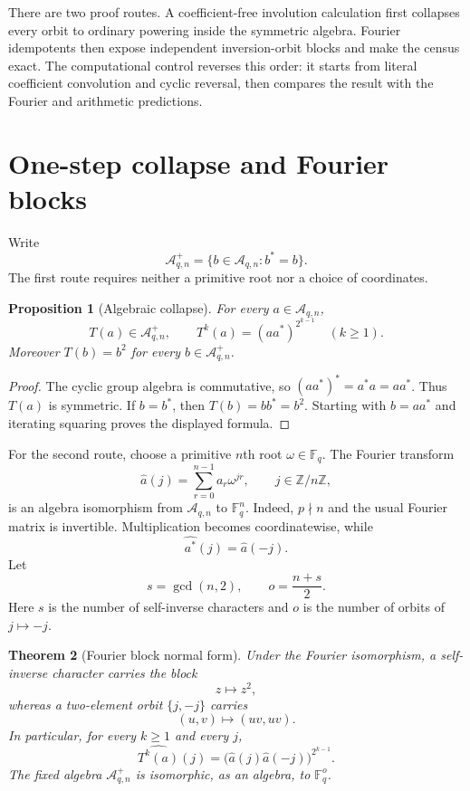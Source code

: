 \documentclass[11pt,a4paper]{amsart}
\newcommand{\F}{\mathbb F}
\newcommand{\A}{\mathcal A}
\newcommand{\what}[1]{\widehat{#1}}
\newtheorem{theorem}{Theorem}[section]
\newtheorem{proposition}[theorem]{Proposition}
\begin{document}
There are two proof routes.  A coefficient-free involution calculation first
collapses every orbit to ordinary powering inside the symmetric algebra.
Fourier idempotents then expose independent inversion-orbit blocks and make
the census exact.  The computational control reverses this order: it starts
from literal coefficient convolution and cyclic reversal, then compares the
result with the Fourier and arithmetic predictions.

\section{One-step collapse and Fourier blocks}

Write
\[
 \A_{q,n}^+=\{b\in\A_{q,n}:b^*=b\}.
\]
The first route requires neither a primitive root nor a choice of
coordinates.

\begin{proposition}[Algebraic collapse]
\label{prop:collapse}
For every $a\in\A_{q,n}$,
\[
 T(a)\in\A_{q,n}^+,
 \qquad
 T^k(a)=(aa^*)^{2^{k-1}}\quad(k\geq1).
\]
Moreover $T(b)=b^2$ for every $b\in\A_{q,n}^+$.
\end{proposition}

\begin{proof}
The cyclic group algebra is commutative, so
$(aa^*)^*=a^*a=aa^*$.  Thus $T(a)$ is symmetric.  If $b=b^*$, then
$T(b)=bb^*=b^2$.  Starting with $b=aa^*$ and iterating squaring proves the
displayed formula.
\end{proof}

For the second route, choose a primitive $n$th root $\omega\in\F_q$.  The
Fourier transform
\[
 \what a(j)=\sum_{r=0}^{n-1}a_r\omega^{jr},\qquad j\in\mathbb Z/n\mathbb Z,
\]
is an algebra isomorphism from $\A_{q,n}$ to $\F_q^n$.  Indeed,
$p\nmid n$ and the usual Fourier matrix is invertible.  Multiplication becomes
coordinatewise, while
\[
 \what{a^*}(j)=\what a(-j).
\]
Let
\begin{equation}
 \label{eq:so}
 s=\gcd(n,2),\qquad o=\frac{n+s}{2}.
\end{equation}
Here $s$ is the number of self-inverse characters and $o$ is the number of
orbits of $j\mapsto-j$.

\begin{theorem}[Fourier block normal form]
\label{thm:normal}
Under the Fourier isomorphism, a self-inverse character carries the block
\[
 z\longmapsto z^2,
\]
whereas a two-element orbit $\{j,-j\}$ carries
\[
 (u,v)\longmapsto(uv,uv).
\]
In particular, for every $k\geq1$ and every $j$,
\begin{equation}
 \label{eq:iterate}
 \what{T^k(a)}(j)
 =\bigl(\what a(j)\what a(-j)\bigr)^{2^{k-1}}.
\end{equation}
The fixed algebra $\A_{q,n}^+$ is isomorphic, as an algebra, to $\F_q^o$.
\end{theorem}
\end{document}
